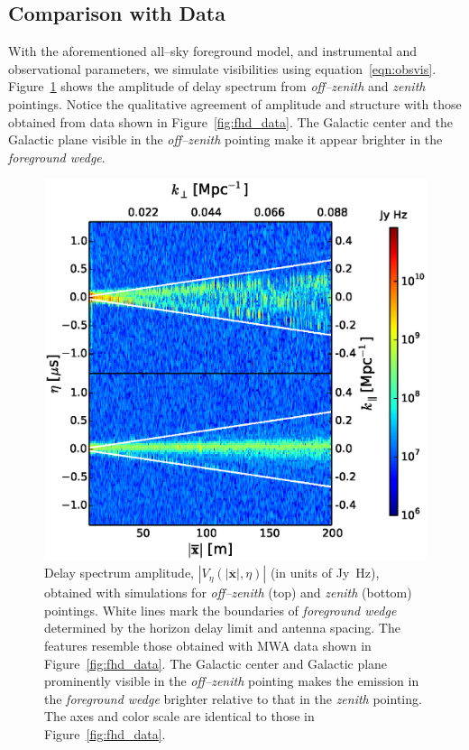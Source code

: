 \documentclass[preprint2,iop,numberedappendix]{emulateapj}
\begin{document}
\subsection{Comparison with Data}\label{sec:data-vs-model}

With the aforementioned all--sky foreground model, and instrumental and observational parameters, we simulate visibilities using equation~\ref{eqn:obsvis}. Figure~\ref{fig:sim_data} shows the amplitude of delay spectrum from {\it off--zenith} and {\it zenith} pointings. Notice the qualitative agreement of amplitude and structure with those obtained from data shown in Figure~\ref{fig:fhd_data}. The Galactic center and the Galactic plane visible in the {\it off--zenith} pointing make it appear brighter in the {\it foreground wedge}. 

\begin{figure}[htb]
\centering
\includegraphics[width=\linewidth]{figures/v1_0/multi_baseline_sim_delay_spectrum_snapshots.eps}
\caption{Delay spectrum amplitude, $|V_\eta(|\overline{\mathbf{x}}|,\eta)|$ (in units of Jy~Hz), obtained with simulations for {\it off--zenith} (top) and {\it zenith} (bottom) pointings. White lines mark the boundaries of {\it foreground wedge} determined by the horizon delay limit and antenna spacing. The features resemble those obtained with MWA data shown in Figure~\ref{fig:fhd_data}. The Galactic center and Galactic plane prominently visible in the {\it off--zenith} pointing makes the emission in the {\it foreground wedge} brighter relative to that in the {\it zenith} pointing. The axes and color scale are identical to those in Figure~\ref{fig:fhd_data}. \label{fig:sim_data}}
\end{figure}
\end{document}
